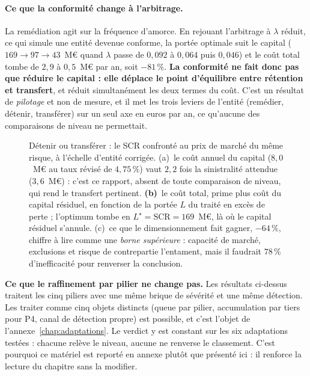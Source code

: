 \paragraph{Ce que la conformité change à l'arbitrage.} La remédiation agit sur la fréquence
d'amorce. En rejouant l'arbitrage à $\lambda$ réduit, ce qui simule une entité devenue
conforme, la portée optimale suit le capital ($169 \to 97 \to 43$~M\euro{} quand $\lambda$
passe de $0{,}092$ à $0{,}064$ puis $0{,}046$) et le coût total tombe de $2{,}9$ à
$0{,}5$~M\euro{} par an, soit $-81\,\%$. \textbf{La conformité ne fait
donc pas que réduire le
capital : elle déplace le point d'équilibre entre rétention et transfert}, et réduit
simultanément les deux termes du coût. C'est un résultat de \emph{pilotage} et non de mesure,
et il met les trois leviers de l'entité (remédier, détenir, transférer) sur un seul axe en
euros par an, ce qu'aucune des comparaisons de niveau ne permettait.

\begin{figure}[htbp]
  \centering
  \caption{Détenir ou transférer : le SCR confronté au prix de
marché du même risque, à l'échelle d'entité corrigée. (a)~le coût annuel du capital
($8{,}0$~M\euro{} au taux révisé de $4{,}75\,\%$) vaut $2{,}2$ fois la sinistralité attendue
($3{,}6$~M\euro{}) : c'est ce rapport, absent de toute comparaison de niveau, qui rend le
transfert pertinent.
\textbf{(b)}~le coût total, prime plus coût du capital résiduel, en fonction de la portée $L$ du
traité en excès de perte ; l'optimum tombe en $L^\star=\mathrm{SCR}=169$~M\euro, là où le
capital résiduel s'annule. (c)~ce que le dimensionnement fait gagner, $-64\,\%$, chiffre
à lire comme une \emph{borne supérieure} : capacité de marché, exclusions et risque de
contrepartie l'entament, mais il faudrait $78\,\%$ d'inefficacité pour renverser la conclusion.}
  \label{fig:detenir}
\end{figure}

\begin{cle}
\textbf{Ce que le raffinement par pilier ne change pas.} Les résultats ci-dessus traitent les
cinq piliers avec une même brique de sévérité et une même détection. Les traiter comme cinq
objets distincts (queue par pilier, accumulation par tiers pour P4, canal de détection
propre) est possible, et c'est l'objet de l'annexe~\ref{chap:adaptations}. Le verdict y est
constant sur les six adaptations testées : chacune relève le niveau, aucune ne
renverse le classement. C'est pourquoi ce matériel est reporté en annexe plutôt que
présenté ici : il renforce la lecture du chapitre sans la modifier.
\end{cle}

